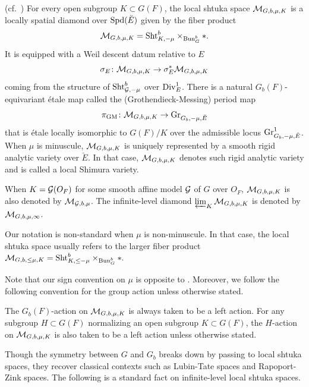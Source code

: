 \documentclass[12pt,reqno]{amsart}
\begin{document}
\begin{defi}\textup{(cf.\ \cite[Section 23.3]{SW20})}
    For every open subgroup $K \subset G(F)$, the local shtuka space ${\mathcal{M}}_{G, b, \mu, K}$ is a locally spatial diamond over ${\operatorname{Spd}}(\breve{E})$ given by the fiber product 
    \[
        {\mathcal{M}}_{G, b, \mu, K} = {\operatorname{Sht}}^b_{K, -\mu} \times_{{\operatorname{Bun}}_G^b} \ast. 
    \]
    It is equipped with a Weil descent datum relative to $E$
    \[
        \sigma_E \colon {\mathcal{M}}_{G, b, \mu, K} \to \sigma_E^*{\mathcal{M}}_{G, b, \mu, K}
    \]
    coming from the structure of ${\operatorname{Sht}}^b_{{\mathcal{G}}, -\mu}$ over ${\operatorname{Div}}^1_E$. There is a natural $G_b(F)$-equivariant \'{e}tale map called the (Grothendieck-Messing) period map
    \[
        \pi_{{\operatorname{GM}}} \colon {\mathcal{M}}_{G, b, \mu, K} \to {\operatorname{Gr}}_{G_b, -\mu, \breve{E}}
    \]
    that is \'{e}tale locally isomorphic to $G(F) / K$ over the admissible locus ${\operatorname{Gr}}_{G_b, -\mu, \breve{E}}^1$. When $\mu$ is minuscule, ${\mathcal{M}}_{G, b, \mu, K}$ is uniquely represented by a smooth rigid analytic variety over $\breve{E}$. In that case, ${\mathcal{M}}_{G, b, \mu, K}$ denotes such rigid analytic variety and is called a local Shimura variety. 

    When $K = {\mathcal{G}}(O_F)$ for some smooth affine model ${\mathcal{G}}$ of $G$ over $O_F$, ${\mathcal{M}}_{G, b, \mu, K}$ is also denoted by ${\mathcal{M}}_{{\mathcal{G}}, b, \mu}$. The infinite-level diamond $\varprojlim_K {\mathcal{M}}_{G, b, \mu, K}$ is denoted by ${\mathcal{M}}_{G, b, \mu, \infty}$. 
\end{defi}

\begin{rmk}
    Our notation is non-standard when $\mu$ is non-minuscule. In that case, the local shtuka space usually refers to the larger fiber product 
    $
        {\mathcal{M}}_{G, b, \leq \mu, K} = {\operatorname{Sht}}^b_{K, \leq -\mu} \times_{{\operatorname{Bun}}_G^b} \ast. 
    $
\end{rmk}

Note that our sign convention on $\mu$ is opposite to \cite{SW20}. Moreover, we follow the following convention for the group action unless otherwise stated. 

\begin{conv} \label{conv:group_action}
    The $G_b(F)$-action on ${\mathcal{M}}_{G, b, \mu, K}$ is always taken to be a left action. For any subgroup $H \subset G(F)$ normalizing an open subgroup $K \subset G(F)$, the $H$-action on ${\mathcal{M}}_{G, b, \mu, K}$ is also taken to be a left action unless otherwise stated. 
\end{conv}

Though the symmetry between $G$ and $G_b$ breaks down by passing to local shtuka spaces, they recover classical contexts such as Lubin-Tate spaces and Rapoport-Zink spaces. %
The following is a standard fact on infinite-level local shtuka spaces. 
\end{document}
